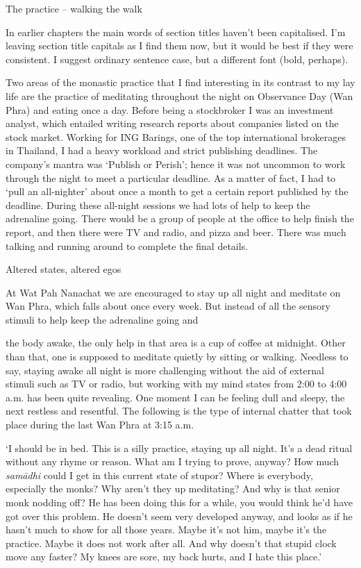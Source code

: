 The practice -- walking the walk

In earlier chapters the main words of section titles haven't been
capitalised. I'm leaving section title capitals as I find them now, but
it would be best if they were consistent. I suggest ordinary sentence
case, but a different font (bold, perhaps).

Two areas of the monastic practice that I find interesting in its
contrast to my lay life are the practice of meditating throughout the
night on Observance Day (Wan Phra) and eating once a day. Before being a
stockbroker I was an investment analyst, which entailed writing research
reports about companies listed on the stock market. Working for ING
Barings, one of the top international brokerages in Thailand, I had a
heavy workload and strict publishing deadlines. The company's mantra was
`Publish or Perish'; hence it was not uncommon to work through the night
to meet a particular deadline. As a matter of fact, I had to `pull an
all-nighter' about once a month to get a certain report published by the
deadline. During these all-night sessions we had lots of help to keep
the adrenaline going. There would be a group of people at the office to
help finish the report, and then there were TV and radio, and pizza and
beer. There was much talking and running around to complete the final
details.

Altered states, altered egos

At Wat Pah Nanachat we are encouraged to stay up all night and meditate
on Wan Phra, which falls about once every week. But instead of all the
sensory stimuli to help keep the adrenaline going and

the body awake, the only help in that area is a cup of coffee at
midnight. Other than that, one is supposed to meditate quietly by
sitting or walking. Needless to say, staying awake all night is more
challenging without the aid of external stimuli such as TV or radio, but
working with my mind states from 2:00 to 4:00 a.m. has been quite
revealing. One moment I can be feeling dull and sleepy, the next
restless and resentful. The following is the type of internal chatter
that took place during the last Wan Phra at 3:15 a.m.

`I should be in bed. This is a silly practice, staying up all night.
It's a dead ritual without any rhyme or reason. What am I trying to
prove, anyway? How much \emph{samādhi} could I get in this current state
of stupor? Where is everybody, especially the monks? Why aren't they up
meditating? And why is that senior monk nodding off? He has been doing
this for a while, you would think he'd have got over this problem. He
doesn't seem very developed anyway, and looks as if he hasn't much to
show for all those years. Maybe it's not him, maybe it's the practice.
Maybe it does not work after all. And why doesn't that stupid clock move
any faster? My knees are sore, my back hurts, and I hate this place.'

